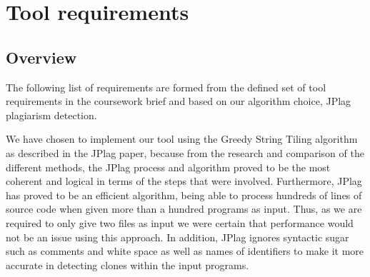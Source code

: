 \section{Tool requirements}

\subsection{Overview}
The following list of requirements are formed from the defined set of tool requirements in the coursework brief and based on our algorithm choice, JPlag plagiarism detection.

We have chosen to implement our tool using the Greedy String Tiling algorithm as described in the JPlag paper, because from the research and comparison of the different methods, the JPlag process and algorithm proved to be the most coherent and logical in terms of the steps that were involved. Furthermore, JPlag has proved to be an efficient algorithm, being able to process hundreds of lines of source code when given more than a hundred programs as input. Thus, as we are required to only give two files as input we were certain that performance would not be an issue using this approach. In addition, JPlag ignores syntactic sugar such as comments and white space as well as names of identifiers to make it more accurate in detecting clones within the input programs.
